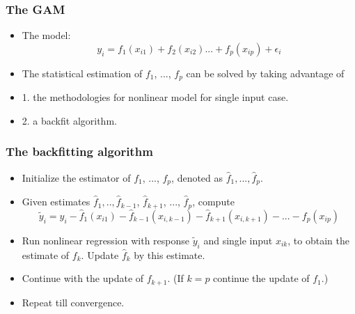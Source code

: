 \documentclass{beamer}
\begin{document}
\begin{frame}
	\frametitle{The GAM  }
	\begin{itemize}
		
		\item  The model:
		$$ y_i = f_1(x_{i1}) + f_2(x_{i2}) ...+ f_p(x_{ip}) + \epsilon_i$$ 
		\item  The statistical estimation of $f_1$, ..., $f_p$ can be solved by
		taking advantage of 
		\item  1. the methodologies for nonlinear model for single input case.
		\item  2. a backfit algorithm.
	\end{itemize}
\end{frame}

%		
% 
 
  

\begin{frame}
	\frametitle{The backfitting algorithm  }
	\begin{itemize}
		
		\item  Initialize the estimator of $f_1$, ..., $f_p$, denoted as
		$\hat f_1, ..., \hat f_p $.
		\item  Given estimates $\hat f_1, .., \hat f_{k-1}$, $\hat f_{k+1}$, ..., $ \hat f_p$,  
		compute 
		 $$\tilde y_i = y_i - \hat f_1(x_{i1}) - \hat f_{k-1}(x_{i, k-1})- \hat f_{k+1} (x_{i, k+1}) - ...- f_p(x_{ip})$$
		\item  Run nonlinear regression with response $\tilde y_i$ and single input $x_{ik}$, to obtain the estimate 
		of $f_k$. Update $\hat f_k$ by this estimate.
		\item Continue with the update of $f_{k+1}$. (If $k=p$ continue the update of $f_1$.)
		\item Repeat till convergence.
	\end{itemize}
\end{frame}
\end{document}
